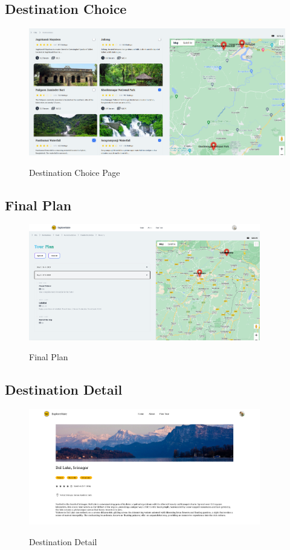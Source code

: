 \documentclass[12pt]{article}
\begin{document}
\subsection{Destination Choice}
\begin{figure}[H]
    \centering
        \includegraphics[width=\textwidth]{Mock UI/Destination Choice.png}
        \label{fig:destination_choice_ui}
    \caption{Destination Choice Page}
\end{figure}

\newpage

\subsection{Final Plan}
\begin{figure}[H]
    \centering
        \includegraphics[width=0.9\textwidth]{Mock UI/Final Plan.png}
        \label{fig:final_plan_ui}
    \caption{Final Plan}
\end{figure}

\subsection{Destination Detail}
\begin{figure}[H]
    \centering
        \includegraphics[width=0.9\textwidth]{Mock UI/Destination Detail.png}
        \label{fig:destination_detail_ui}
    \caption{Destination Detail}
\end{figure}
\end{document}
